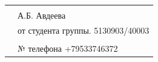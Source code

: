 








\thispagestyle{empty}%

\noindent
\begin{minipage}{\linewidth}
	\vspace{\mfloatsep} %
	\begin{tabularx}{\linewidth}{Xl}
		&\HeadApTitle     \\ 			
		&А.Б. Авдеева     \\
		& от студента группы. 5130903/40003 \\
		& \AuthorFull \\
		& № телефона +79533746372 \\ 
	\end{tabularx}
	\vspace{\mfloatsep} %
\end{minipage}


